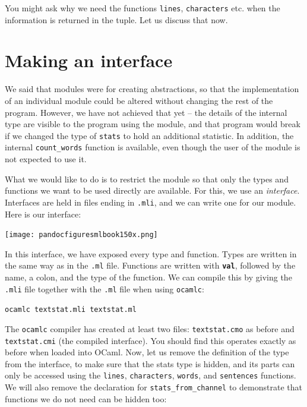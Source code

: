 \documentclass[]{book}
\newcommand{\smspace}{\vspace{4mm}}
\begin{document}
\noindent You might ask why we need the functions \texttt{lines}, \texttt{characters} etc. when the information is returned in the tuple. Let us discuss that now.

\section*{Making an interface}

We said that modules were for creating abstractions, so that the implementation of an individual module could be altered without changing the rest of the program. However, we have not achieved that yet -- the details of the internal type are visible to the program using the module, and that program would break if we changed the type of \texttt{stats} to hold an additional statistic. In addition, the internal \texttt{count\_words} function is available, even though the user of the module is not expected to use it.

What we would like to do is to restrict the module so that only the types and functions we want to be used directly are available. For this, we use an \textit{interface}. Interfaces are held in files ending in \texttt{.mli}, and we can write one for our module. Here is our interface:

\medskip
\begin{center}
\noindent\texttt{[image: pandocfiguresmlbook150x.png]}
\end{center}
\medskip


In this interface, we have exposed every type and function. Types are written in the same way as in the \texttt{.ml} file. Functions are written with \texttt{\textbf{val}}, followed by the name, a colon, and the type of the function. We can compile this by giving the \texttt{.mli} file together with the \texttt{.ml} file when using \texttt{ocamlc}:

\smspace
\texttt{ocamlc textstat.mli textstat.ml}
\smspace

\noindent The \texttt{ocamlc} compiler has created at least two files: \texttt{textstat.cmo} as before and \texttt{textstat.cmi} (the compiled interface). You should find this operates exactly as before when loaded into OCaml. Now, let us remove the definition of the type from the interface, to make sure that the stats type is hidden, and its parts can only be accessed using the \texttt{lines}, \texttt{characters}, \texttt{words}, and \texttt{sentences} functions. We will also remove the declaration for \texttt{stats\_from\_channel} to demonstrate that functions we do not need can be hidden too:
\end{document}
